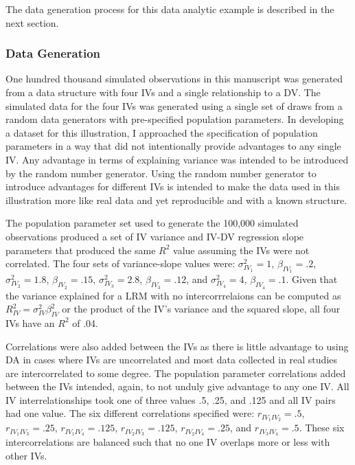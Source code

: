\documentclass[ShortAfour,times,sageapa]{sagej}
\begin{document}
	The data generation process for this data analytic example is described in the next section.
	
		\subsubsection{Data Generation}
		
	One hundred thousand simulated observations in this manuscript was generated from a data structure with four IVs and a single relationship to a DV.
	The simulated data for the four IVs was generated using a single set of draws from a random data generators with pre-specified population parameters.
	In developing a dataset for this illustration, I approached the specification of population parameters in a way that did not intentionally provide advantages to any single IV.  
	Any advantage in terms of explaining variance was intended to be introduced by the random number generator.
	Using the random number generator to introduce advantages for different IVs is intended to make the data used in this illustration more like real data and yet reproducible and with a known structure.
	
	The population parameter set used to generate the 100,000 simulated observations produced a set of IV variance and IV-DV regression slope parameters that produced the same $R^2$ value assuming the IVs were not correlated.  The four sets of variance-slope values were: $\sigma^2_{IV_1} = 1$, $\beta_{IV_1} =.2$, $\sigma^2_{IV_2} = 1.8$, $\beta_{IV_2} =.15$, $\sigma^2_{IV_3} = 2.8$, $\beta_{IV_3} =.12$, and $\sigma^2_{IV_4} = 4$, $\beta_{IV_4} =.1$. 
	Given that the variance explained for a LRM with no intercorrrelaions can be computed as $R^2_{IV} = \sigma^2_{IV}\beta^2_{IV}$ or the product of the IV's variance and the squared slope, all four IVs have an $R^2$ of .04.
	
	Correlations were also added between the IVs as there is little advantage to using DA in cases where IVs are uncorrelated and most data collected in real studies are intercorrelated to some degree.  
	The population parameter correlations added between the IVs intended, again, to not unduly give advantage to any one IV.  
	All IV interrelationships took one of three values .5, .25, and .125 and all IV pairs had one value.  The six different correlations specified were: $r_{IV_1 IV_2} = .5$, $r_{IV_1 IV_3} = .25$, $r_{IV_1 IV_4} = .125$, $r_{IV_2 IV_3} = .125$, $r_{IV_2 IV_4} = .25$, and $r_{IV_3 IV_4} = .5$.  
	These six intercorrelations are balanced such that no one IV overlaps more or less with other IVs.
\end{document}
